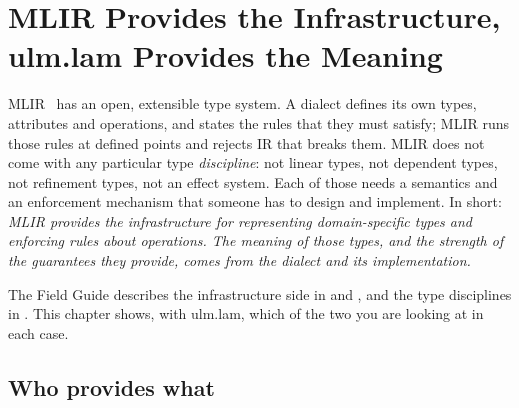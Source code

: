 \chapter{MLIR Provides the Infrastructure, ulm.lam Provides the Meaning}
\label{ch:infra}

\begin{answer}
MLIR~\cite{mlir} has an open, extensible type system. A dialect defines its own types,
attributes and operations, and states the rules that they must satisfy;
MLIR runs those rules at defined points and rejects IR that breaks them. MLIR
does not come with any particular type \emph{discipline}: not linear types,
not dependent types, not refinement types, not an effect system. Each of
those needs a semantics and an enforcement mechanism that someone has to
design and implement. In short: \emph{MLIR provides the infrastructure for
representing domain-specific types and enforcing rules about operations.
The meaning of those types, and the strength of the guarantees they provide,
comes from the dialect and its implementation.}
\end{answer}

The Field Guide describes the infrastructure side in  and , and the
type disciplines in . This
chapter shows, with ulm.lam, which of the two you are looking at in each
case.

\section{Who provides what}
\label{sec:infra-who}

